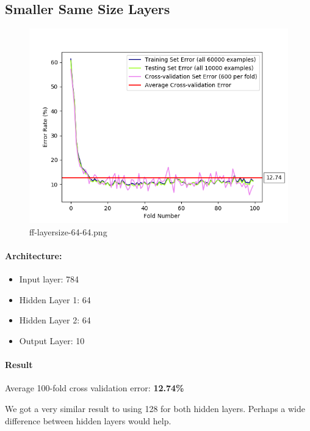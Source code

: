 \documentclass[11pt]{article}
\makeatletter
\def\maxwidth{\ifdim\Gin@nat@width>\linewidth\linewidth
    \else\Gin@nat@width\fi}
\let\Oldincludegraphics\includegraphics
\renewcommand{\includegraphics}[1]{\Oldincludegraphics[width=.8\maxwidth]{#1}}
\providecommand{\tightlist}{%
      \setlength{\itemsep}{0pt}\setlength{\parskip}{0pt}}
\makeatother
\begin{document}
\pagebreak

\subsection{Smaller Same Size Layers}\label{smaller-same-size-layers}

\begin{figure}[htbp]
\centering
\includegraphics{plots/ff-layersize-64-64.png}
\caption{ff-layersize-64-64.png}
\end{figure}

\paragraph{Architecture:}\label{architecture-5}

\begin{itemize}
\tightlist
\item
  Input layer: 784
\item
  Hidden Layer 1: 64
\item
  Hidden Layer 2: 64
\item
  Output Layer: 10
\end{itemize}

\paragraph{Result}\label{result-5}

Average 100-fold cross validation error: \textbf{12.74\%}

We got a very similar result to using 128 for both hidden layers.
Perhaps a wide difference between hidden layers would help.
\end{document}
